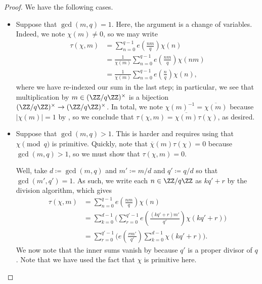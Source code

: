 \documentclass[../notes.tex]{subfiles}
\begin{document}
\begin{proof}
	We have the following cases.
	\begin{itemize}
		\item Suppose that $\gcd(m,q)=1$. Here, the argument is a change of variables. Indeed, we note $\chi(m)\ne0$, so we may write
		\begin{align*}
			\tau(\chi,m) &= \sum_{n=0}^{q-1}e\left(\frac{nm}q\right)\chi(n) \\
			&= \frac1{\chi(m)}\sum_{n=0}^{q-1}e\left(\frac{nm}q\right)\chi(nm) \\
			&= \frac1{\chi(m)}\sum_{n=0}^{q-1}e\left(\frac{n}q\right)\chi(n),
		\end{align*}
		where we have re-indexed our sum in the last step; in particular, we see that multiplication by $m\in(\ZZ/q\ZZ)^\times$ is a bijection $(\ZZ/q\ZZ)^\times\to(\ZZ/q\ZZ)^\times$. In total, we note $\chi(m)^{-1}=\overline{\chi(m)}$ because $|\chi(m)|=1$ by , so we conclude that $\tau(\chi,m)=\overline{\chi(m)}\tau(\chi)$, as desired.
		\item Suppose that $\gcd(m,q)>1$. This is harder and requires using that $\chi\pmod q$ is primitive. Quickly, note that $\overline\chi(m)\tau(\chi)=0$ because $\gcd(m,q)>1$, so we must show that $\tau(\chi,m)=0$.

		Well, take $d\coloneqq\gcd(m,q)$ and $m'\coloneqq m/d$ and $q'\coloneqq q/d$ so that $\gcd(m',q')=1$. As such, we write each $n\in\ZZ/q\ZZ$ as $kq'+r$ by the division algorithm, which gives
		\begin{align*}
			\tau(\chi,m) &= \sum_{n=0}^{q-1}e\left(\frac{nm}q\right)\chi(n) \\
			&= \sum_{k=0}^{d-1}\Bigg(\sum_{r=0}^{q'-1}e\left(\frac{(kq'+r)m'}{q'}\right)\chi(kq'+r)\Bigg) \\
			&= \sum_{r=0}^{q'-1}\Bigg(e\left(\frac{rm'}{q'}\right)\sum_{k=0}^{d-1}\chi(kq'+r)\Bigg).
		\end{align*}
		We now note that the inner sums vanish by  because $q'$ is a proper divisor of $q$. Note that we have used the fact that $\chi$ is primitive here.
		\qedhere
	\end{itemize}
\end{proof}
\end{document}
